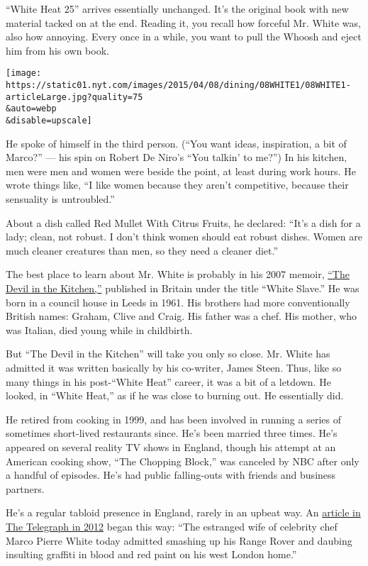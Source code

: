 ``White Heat 25'' arrives essentially unchanged. It's the original book
with new material tacked on at the end. Reading it, you recall how
forceful Mr. White was, also how annoying. Every once in a while, you
want to pull the Whoosh and eject him from his own book.

\texttt{[image: https://static01.nyt.com/images/2015/04/08/dining/08WHITE1/08WHITE1-articleLarge.jpg?quality=75\\\&auto=webp\\\&disable=upscale]}

He spoke of himself in the third person. (``You want ideas, inspiration,
a bit of Marco?'' --- his spin on Robert De Niro's ``You talkin' to
me?'') In his kitchen, men were men and women were beside the point, at
least during work hours. He wrote things like, ``I like women because
they aren't competitive, because their sensuality is untroubled.''

About a dish called Red Mullet With Citrus Fruits, he declared: ``It's a
dish for a lady; clean, not robust. I don't think women should eat
robust dishes. Women are much cleaner creatures than men, so they need a
cleaner diet.''

The best place to learn about Mr. White is probably in his 2007 memoir,
\href{http://www.nytimes.com/2007/05/27/books/review/Kamp-t.html?pagewanted=1}{``The
Devil in the Kitchen,''} published in Britain under the title ``White
Slave.'' He was born in a council house in Leeds in 1961. His brothers
had more conventionally British names: Graham, Clive and Craig. His
father was a chef. His mother, who was Italian, died young while in
childbirth.

But ``The Devil in the Kitchen'' will take you only so close. Mr. White
has admitted it was written basically by his co-writer, James Steen.
Thus, like so many things in his post-``White Heat'' career, it was a
bit of a letdown. He looked, in ``White Heat,'' as if he was close to
burning out. He essentially did.

He retired from cooking in 1999, and has been involved in running a
series of sometimes short-lived restaurants since. He's been married
three times. He's appeared on several reality TV shows in England,
though his attempt at an American cooking show, ``The Chopping Block,''
was canceled by NBC after only a handful of episodes. He's had public
falling-outs with friends and business partners.

He's a regular tabloid presence in England, rarely in an upbeat way. An
\href{http://www.telegraph.co.uk/news/uknews/law-and-order/9589784/Marco-Pierre-Whites-wife-scrawled-insults-in-blood-on-wall-of-chefs-home.html}{article
in The Telegraph in 2012} began this way: ``The estranged wife of
celebrity chef Marco Pierre White today admitted smashing up his Range
Rover and daubing insulting graffiti in blood and red paint on his west
London home.''

